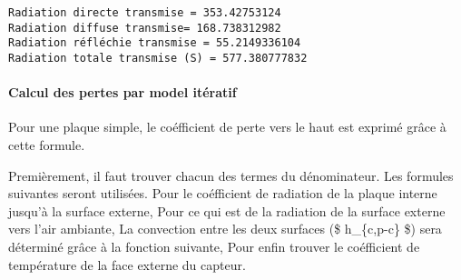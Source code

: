 \documentclass{article}
\begin{document}
    \begin{Verbatim}[commandchars=\\\{\}]
Radiation directe transmise = 353.42753124
Radiation diffuse transmise= 168.738312982
Radiation réfléchie transmise = 55.2149336104
Radiation totale transmise (S) = 577.380777832
    \end{Verbatim}

    

    \paragraph{Calcul des pertes par model
itératif}\label{calcul-des-pertes-par-model-ituxe9ratif}

Pour une plaque simple, le coéfficient de perte vers le haut est exprimé
grâce à cette formule. 

    Premièrement, il faut trouver chacun des termes du dénominateur. Les
formules suivantes seront utilisées. Pour le coéfficient de radiation de
la plaque interne jusqu'à la surface externe, Pour ce qui est de la
radiation de la surface externe vers l'air ambiante, La convection entre
les deux surfaces (\$ h\_\{c,p-c\} \$) sera déterminé grâce à la
fonction suivante, Pour enfin trouver le coéfficient de température de
la face externe du capteur. 
\end{document}
